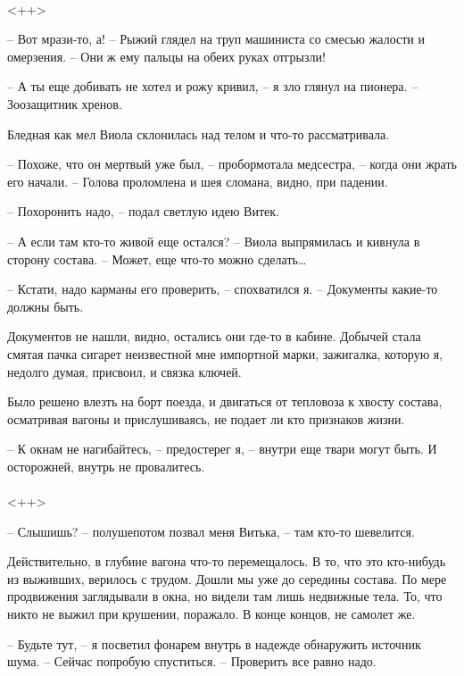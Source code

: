 \documentclass[a4paper]{book}
\begin{document}
\paragraph{}<++>

-- Вот мрази-то, а! -- Рыжий глядел на труп машиниста со смесью жалости и омерзения. -- Они ж ему пальцы на обеих руках отгрызли!

-- А ты еще добивать не хотел и рожу кривил, -- я зло глянул на пионера. -- Зоозащитник хренов. 

Бледная как мел Виола склонилась над телом и что-то рассматривала. 

-- Похоже, что он мертвый уже был, -- пробормотала медсестра, -- когда они жрать его начали. -- Голова проломлена и шея сломана, видно, при падении. 

-- Похоронить  надо, -- подал светлую идею Витек.

-- А если там кто-то живой еще остался? -- Виола выпрямилась и кивнула в сторону состава. -- Может, еще что-то можно сделать\ldots

-- Кстати, надо карманы его проверить, -- спохватился я. -- Документы какие-то должны быть. 

Документов не нашли, видно, остались они где-то в кабине. Добычей стала смятая пачка сигарет неизвестной мне импортной марки, зажигалка, которую я, недолго думая, присвоил, и связка ключей. 

Было решено влезть на борт поезда, и двигаться от тепловоза к хвосту состава, осматривая вагоны и прислушиваясь, не подает ли кто признаков жизни.

-- К окнам не нагибайтесь, -- предостерег я, -- внутри еще твари могут быть. И осторожней, внутрь не провалитесь.

\paragraph{}<++>

-- Слышишь? -- полушепотом позвал меня Витька, -- там кто-то шевелится.

Действительно, в глубине вагона что-то перемещалось. В то, что это кто-нибудь из выживших, верилось с трудом. Дошли мы уже до середины состава. По мере продвижения заглядывали в окна, но видели там лишь недвижные тела. То, что никто не выжил при крушении, поражало. В конце концов, не самолет же.

-- Будьте тут, -- я посветил фонарем внутрь в надежде обнаружить источник шума. -- Сейчас попробую спуститься. --  Проверить все равно надо.
\end{document}

